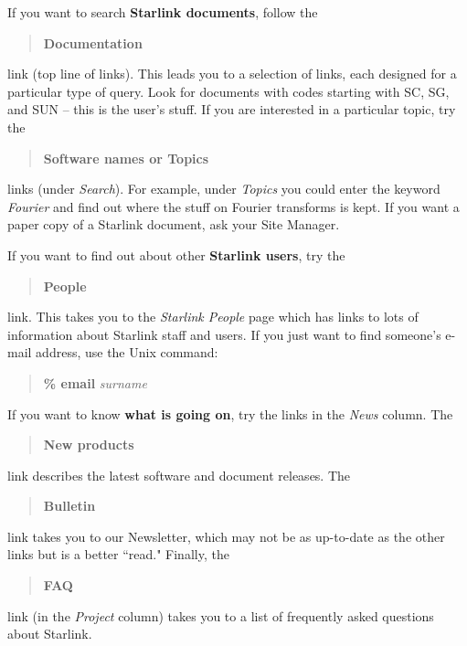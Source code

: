 \documentclass[twoside]{article}
\newcommand{\htmladdnormallink}[2]{#1}
\begin{document}
If you want to search {\bf Starlink documents}, follow the
\begin{quote}
\htmladdnormallink{\bf Documentation}
{http://www.starlink.ac.uk/docs.html}
\end{quote}
link (top line of links).
This leads you to a selection of links, each designed for a particular type of
query.
Look for documents with codes starting with SC, SG, and SUN -- this is the
user's stuff.
If you are interested in a particular topic, try the
\begin{quote}
\htmladdnormallink{\bf Software names}
{http://www.starlink.ac.uk/cgi-bin/ssilist/ssilist} {\rm or}
\htmladdnormallink{\bf Topics}
{http://www.starlink.ac.uk/cgi-bin/htxfinder}
\end{quote}
links (under {\em Search}).
For example, under {\em Topics}\/ you could enter the keyword
{\em Fourier}\/ and find out where the stuff on Fourier transforms is kept.
If you want a paper copy of a Starlink document, ask your Site Manager.

If you want to find out about other {\bf Starlink users}, try the
\begin{quote}
\htmladdnormallink{\bf People}{http://www.starlink.ac.uk/people.html}
\end{quote}
link.
This takes you to the {\em Starlink People}\/ page which has links to lots of
information about Starlink staff and users.
If you just want to find someone's e-mail address, use the Unix command:
\begin{quote}
{\bf \% email} {\it surname}
\end{quote}
If you want to know {\bf what is going on}, try the links in the {\em News}\/
column.
The
\begin{quote}
\htmladdnormallink{\bf New products}
{http://www.starlink.ac.uk/\~{}cac/publicity/new_products.html}
\end{quote}
link describes the latest software and document releases.
The
\begin{quote}
\htmladdnormallink{\bf Bulletin}{http://www.starlink.ac.uk/bulletin.html}
\end{quote}
link takes you to our Newsletter, which may not be as up-to-date as the other
links but is a better ``read."
Finally, the
\begin{quote}
\htmladdnormallink{\bf FAQ}
{http://www.starlink.ac.uk/\~{}cac/publicity/starlink_faq.html}
\end{quote}
link (in the {\em Project}\/ column) takes you to a list of frequently asked
questions about Starlink.
\end{document}
